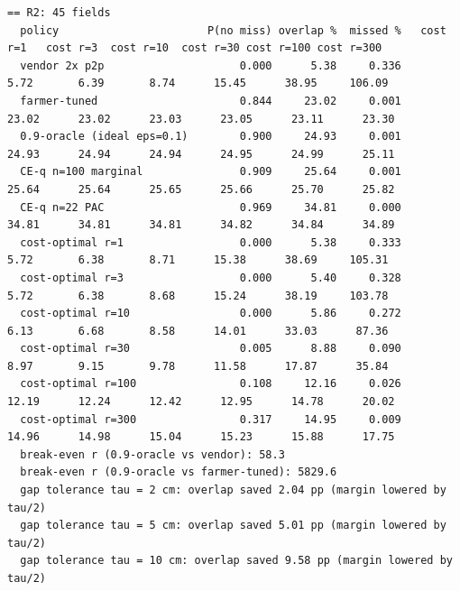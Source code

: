 \documentclass[preprint,12pt,authoryear]{elsarticle}
\begin{document}
\begin{Verbatim}[fontsize=\tiny,breaklines]
== R2: 45 fields
  policy                       P(no miss) overlap %  missed %   cost r=1   cost r=3  cost r=10  cost r=30 cost r=100 cost r=300
  vendor 2x p2p                     0.000      5.38     0.336       5.72       6.39       8.74      15.45      38.95     106.09
  farmer-tuned                      0.844     23.02     0.001      23.02      23.02      23.03      23.05      23.11      23.30
  0.9-oracle (ideal eps=0.1)        0.900     24.93     0.001      24.93      24.94      24.94      24.95      24.99      25.11
  CE-q n=100 marginal               0.909     25.64     0.001      25.64      25.64      25.65      25.66      25.70      25.82
  CE-q n=22 PAC                     0.969     34.81     0.000      34.81      34.81      34.81      34.82      34.84      34.89
  cost-optimal r=1                  0.000      5.38     0.333       5.72       6.38       8.71      15.38      38.69     105.31
  cost-optimal r=3                  0.000      5.40     0.328       5.72       6.38       8.68      15.24      38.19     103.78
  cost-optimal r=10                 0.000      5.86     0.272       6.13       6.68       8.58      14.01      33.03      87.36
  cost-optimal r=30                 0.005      8.88     0.090       8.97       9.15       9.78      11.58      17.87      35.84
  cost-optimal r=100                0.108     12.16     0.026      12.19      12.24      12.42      12.95      14.78      20.02
  cost-optimal r=300                0.317     14.95     0.009      14.96      14.98      15.04      15.23      15.88      17.75
  break-even r (0.9-oracle vs vendor): 58.3
  break-even r (0.9-oracle vs farmer-tuned): 5829.6
  gap tolerance tau = 2 cm: overlap saved 2.04 pp (margin lowered by tau/2)
  gap tolerance tau = 5 cm: overlap saved 5.01 pp (margin lowered by tau/2)
  gap tolerance tau = 10 cm: overlap saved 9.58 pp (margin lowered by tau/2)


\end{Verbatim}
\end{document}

